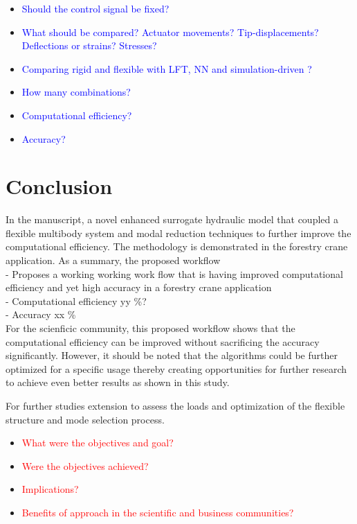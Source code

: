 \begin{itemize}   
    \item \textcolor{blue}{Should the control signal be fixed?}

    \item \textcolor{blue}{What should be compared? Actuator movements? Tip-displacements? Deflections or strains? Stresses?}

    \item \textcolor{blue}{Comparing rigid and flexible with LFT, NN and simulation-driven  ?}

    \item \textcolor{blue}{How many combinations?}

       \item \textcolor{blue}{Computational efficiency?}
       
          \item \textcolor{blue}{Accuracy?}
     
\end{itemize}

\section{Conclusion}

In the manuscript, a novel enhanced surrogate hydraulic model that coupled a flexible multibody system and modal reduction techniques to further improve the computational efficiency. The methodology is demonstrated in the forestry crane application. As a summary, the proposed workflow \\
- Proposes a working working work flow that is having improved computational efficiency and yet high accuracy in a forestry crane application \\
- Computational efficiency yy \%?\\
- Accuracy xx \% \\

For the scienficic community, this proposed workflow shows that the computational efficiency can be improved without sacrificing the accuracy significantly. However, it should be noted that the algorithms could be further optimized for a specific usage thereby creating opportunities for further research to achieve even better results as shown in this study.

For further studies extension to assess the loads and optimization of the flexible structure and mode selection process. 
\begin{itemize}
    \item \textcolor{red}{What were the objectives and goal?}
    
    \item \textcolor{red}{Were the objectives achieved?}

    \item \textcolor{red}{Implications?}

       \item \textcolor{red}{Benefits of approach in the scientific and business communities?}
\end{itemize}

